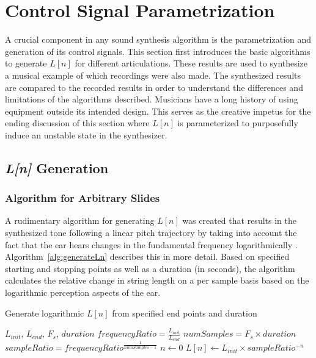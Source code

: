 \documentclass[../main.tex]{subfiles}
\begin{document}
\clearpage

\section{Control Signal Parametrization}
A crucial component in any sound synthesis algorithm is the parametrization and generation of its control signals. This section first introduces the basic algorithms to generate $L[n]$ for different articulations. These results are used to synthesize a musical example of which recordings were also made. The synthesized results are compared to the recorded results in order to understand the differences and limitations of the algorithms described. Musicians have a long history of using equipment outside its intended design. This serves as the creative impetus for the ending discussion of this section where $L[n]$ is parameterized to purposefully induce an unstable state in the synthesizer.

\subsection{\emph{L[n]} Generation}
\subsubsection{Algorithm for Arbitrary Slides}
A rudimentary algorithm for generating $L[n]$ was created that results in the synthesized tone following a linear pitch trajectory by taking into account the fact that the ear hears changes in the fundamental frequency logarithmically . Algorithm~\ref{alg:generateLn} describes this in more detail. Based on specified starting and stopping points as well as a duration (in seconds), the algorithm calculates the relative change in string length on a per sample basis based on the logarithmic perception aspects of the ear.

\begin{algorithm}
\caption{Generate logarithmic $L[n]$ from specified end points and duration}
\label{alg:generateLn}
\begin{algorithmic}
\Require $L_{init}$, $L_{end}$, $F_s$, $duration$
\State $frequencyRatio = \frac{L_{init}}{L_{end}}$
\State $numSamples = F_s \times duration$
\State $sampleRatio = frequencyRatio^{\frac{1}{numSamples-1}}$ 
\State $n \gets 0$
    \State $L[n] \gets L_{init} \times sampleRatio^{-n}$
\EndFor
\end{algorithmic}
\end{algorithm}
\end{document}
